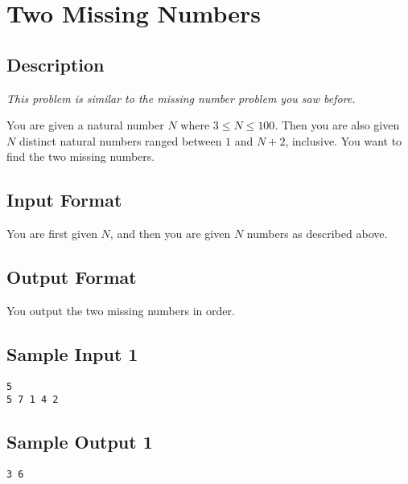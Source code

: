 \documentclass[12pt]{article}
\begin{document}
\setlength{\fboxrule}{.5mm}\setlength{\fboxsep}{1.2mm}
\newlength{\boxlength}\setlength{\boxlength}{\textwidth}
\addtolength{\boxlength}{-4mm}
\begin{center}\end{center}
\vspace{5mm}

\def\ind{\hspace*{0.3in}}
\def\gap{0.2in}


\section{Two Missing Numbers}
\subsection*{Description}
\textit{This problem is similar to the missing number problem you saw before.}

You are given a natural number $N$ where $3 \leq N \leq 100$. 
Then you are also given $N$ distinct natural numbers ranged between $1$ and $N+2$, inclusive.  You want to find the two missing numbers. 

\subsection*{Input Format}
You are first given $N$, and then you are given $N$ numbers as described above. 

\subsection*{Output Format}
You output the two missing numbers in order. 

\subsection*{Sample Input 1}
\begin{verbatim}
5
5 7 1 4 2
\end{verbatim}
\subsection*{Sample Output 1}
\begin{verbatim}
3 6
\end{verbatim}
\end{document}
